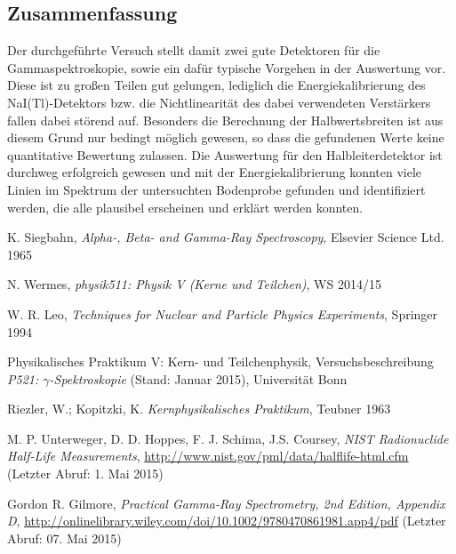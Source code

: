 \documentclass[11pt, a4paper]{article}
\numberwithin{equation}{section}
\begin{document}
\subsection{Zusammenfassung}
Der durchgeführte Versuch stellt damit zwei gute Detektoren für die Gammaspektroskopie, sowie ein dafür typische Vorgehen in der Auswertung vor.
Diese ist zu großen Teilen gut gelungen, lediglich die Energiekalibrierung des NaI(Tl)-Detektors bzw. die Nichtlinearität des dabei verwendeten Verstärkers fallen dabei störend auf.
Besonders die Berechnung der Halbwertsbreiten ist aus diesem Grund nur bedingt möglich gewesen, so dass die gefundenen Werte keine quantitative Bewertung zulassen.
Die Auswertung für den Halbleiterdetektor ist durchweg erfolgreich gewesen und mit der Energiekalibrierung konnten viele Linien im Spektrum der untersuchten Bodenprobe gefunden und identifiziert werden, die alle plausibel erscheinen und erklärt werden konnten.

\FloatBarrier
\vspace{\fill}
\begin{thebibliography}{19}
	K. Siegbahn,
	\emph{Alpha-, Beta- and Gamma-Ray Spectroscopy},
	Elsevier Science Ltd. 1965

	N. Wermes,
	\emph{physik511: Physik V (Kerne und Teilchen)},
	WS 2014/15

	W. R. Leo,
	\emph{Techniques for Nuclear and Particle Physics Experiments},
	Springer 1994

	Physikalisches Praktikum V: Kern- und Teilchenphysik,
	Versuchsbeschreibung \emph{P521: $\gamma$-Spektroskopie} (Stand: Januar 2015),
	Universität Bonn	

	Riezler, W.; Kopitzki, K.
	\emph{Kernphysikalisches Praktikum},
	Teubner 1963

	M. P. Unterweger, D. D. Hoppes, F. J. Schima, J.S. Coursey,
	\emph{NIST Radionuclide Half-Life Measurements},
	\url{http://www.nist.gov/pml/data/halflife-html.cfm} (Letzter Abruf: 1. Mai 2015)
	
	Gordon R. Gilmore,
	\emph{Practical Gamma-Ray Spectrometry, 2nd Edition, Appendix D},
	\url{http://onlinelibrary.wiley.com/doi/10.1002/9780470861981.app4/pdf} (Letzter Abruf: 07. Mai 2015)

\end{thebibliography}
\end{document}
